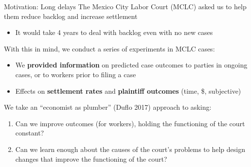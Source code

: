 \documentclass[9pt]{beamer}
\begin{document}
  
 \begin{frame}{Motivation: Long delays}
  The Mexico City Labor Court (MCLC) asked us to help them  \alert{reduce backlog and increase settlement}
  \begin{itemize}
      \item It would take 4 years to deal with backlog even with no new cases


  \end{itemize} 
  
  \vspace{4mm}
  \pause
  
    With this in mind, we conduct a series of experiments in MCLC cases:
    \begin{itemize}
        \item We \textbf{provided information} on predicted case outcomes to parties in \alert{ongoing} cases, or to workers \alert{prior to filing} a case
        \item Effects on \textbf{settlement rates} and \textbf{plaintiff outcomes} (time, \$, subjective)
    \end{itemize}
\pause
\vspace{4mm}
We take an ``economist as plumber'' (Duflo 2017) approach to asking:
\begin{enumerate}
    \item Can we improve outcomes (\alert{for workers}), holding the functioning of the court constant?
    \item Can we learn enough about the causes of the court's problems to help design changes that improve the functioning of the court?
\end{enumerate}
\end{frame}
\end{document}
